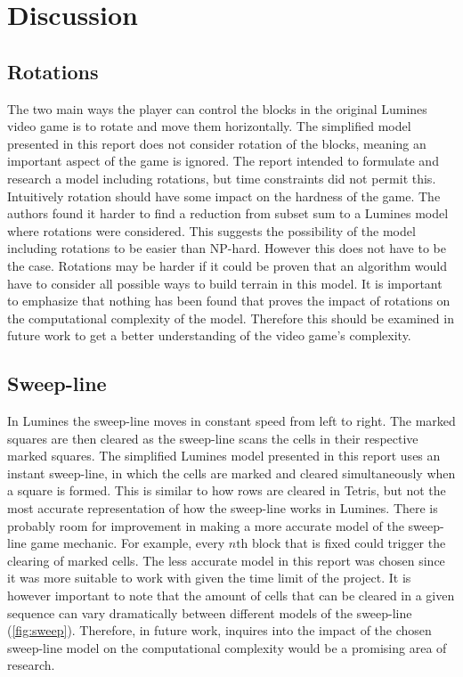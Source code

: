 \section{Discussion}
\label{discussion}

\subsection{Rotations}

The two main ways the player can control the blocks in the original Lumines video game is to rotate and move them horizontally. The simplified model presented in this report does not consider rotation of the blocks, meaning an important aspect of the game is ignored. The report intended to formulate and research a model including rotations, but time constraints did not permit this. Intuitively rotation should have some impact on the hardness of the game. The authors found it harder to find a reduction from subset sum to a Lumines model where rotations were considered. This suggests the possibility of the model including rotations to be easier than NP-hard. However this does not have to be the case. Rotations may be harder if it could be proven that an algorithm would have to consider all possible ways to build terrain in this model. It is important to emphasize that nothing has been found that proves the impact of rotations on the computational complexity of the model. Therefore this should be examined in future work to get a better understanding of the video game's complexity.

\subsection{Sweep-line}

In Lumines the sweep-line moves in constant speed from left to right. The marked squares are then cleared as the sweep-line scans the cells in their respective marked squares. The simplified Lumines model presented in this report uses an instant sweep-line, in which the cells are marked and cleared simultaneously when a square is formed. This is similar to how rows are cleared in Tetris, but not the most accurate representation of how the sweep-line works in Lumines. There is probably room for improvement in making a more accurate model of the sweep-line game mechanic. For example, every $n\text{th}$ block that is fixed could trigger the clearing of marked cells. The less accurate model in this report was chosen since it was more suitable to work with given the time limit of the project. It is however important to note that the amount of cells that can be cleared in a given sequence can vary dramatically between different models of the sweep-line (\autoref{fig:sweep}). Therefore, in future work, inquires into the impact of the chosen sweep-line model on the computational complexity would be a promising area of research.


